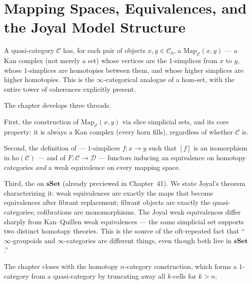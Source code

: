 
\chapter{Mapping Spaces, Equivalences, and the Joyal Model Structure}

\begin{overviewbox}
A quasi-category $\mathcal{C}$ has, for each pair of objects $x, y \in
\mathcal{C}_0$, a  $\mathrm{Map}_\mathcal{C}(x, y)$ —
a Kan complex (not merely a set) whose vertices are the $1$-simplices
from $x$ to $y$, whose $1$-simplices are homotopies between them, and
whose higher simplices are higher homotopies. This is the
$\infty$-categorical analogue of a hom-set, with the entire tower of
coherences explicitly present.

The chapter develops three threads.

First, the construction of $\mathrm{Map}_\mathcal{C}(x, y)$ via slice
simplicial sets, and its core property: it is always a Kan complex
(every horn fills), regardless of whether $\mathcal{C}$ is.

Second, the definition of  —
$1$-simplices $f : x \to y$ such that $[f]$ is an isomorphism in
$\mathrm{ho}(\mathcal{C})$ — and of 
$F : \mathcal{C} \to \mathcal{D}$ — functors inducing an equivalence on
homotopy categories \emph{and} a weak equivalence on every mapping space.

Third, the  on $\mathbf{sSet}$ (already
previewed in Chapter~41). We state Joyal's theorem characterizing it:
weak equivalences are exactly the maps that become equivalences after
fibrant replacement; fibrant objects are exactly the quasi-categories;
cofibrations are monomorphisms. The Joyal weak equivalences differ
sharply from Kan–Quillen weak equivalences — the same simplicial set
supports two distinct homotopy theories. This is the source of the
oft-repeated fact that ``$\infty$-groupoids and $\infty$-categories are
different things, even though both live in $\mathbf{sSet}$.''

The chapter closes with the homotopy $n$-category construction, which
forms a $1$-category from a quasi-category by truncating away all
$k$-cells for $k > n$.
\end{overviewbox}


